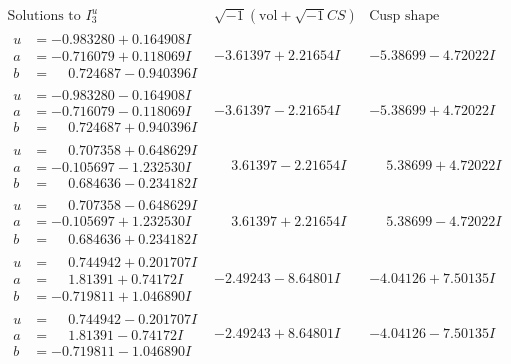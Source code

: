 \documentclass[1p]{elsarticle_modified}
\theoremstyle{definition}
\newcommand{\I}{\sqrt{-1}}
\begin{document}
$$\begin{array}{c|c|c}  
\text{Solutions to }I^u_{3}& \I (\text{vol} + \sqrt{-1}CS) & \text{Cusp shape}\\
 \hline 
\begin{aligned}
u &= -0.983280 + 0.164908 I \\
a &= -0.716079 + 0.118069 I \\
b &= \phantom{-}0.724687 - 0.940396 I\end{aligned}
 & -3.61397 + 2.21654 I & -5.38699 - 4.72022 I \\ \hline\begin{aligned}
u &= -0.983280 - 0.164908 I \\
a &= -0.716079 - 0.118069 I \\
b &= \phantom{-}0.724687 + 0.940396 I\end{aligned}
 & -3.61397 - 2.21654 I & -5.38699 + 4.72022 I \\ \hline\begin{aligned}
u &= \phantom{-}0.707358 + 0.648629 I \\
a &= -0.105697 - 1.232530 I \\
b &= \phantom{-}0.684636 - 0.234182 I\end{aligned}
 & \phantom{-}3.61397 - 2.21654 I & \phantom{-}5.38699 + 4.72022 I \\ \hline\begin{aligned}
u &= \phantom{-}0.707358 - 0.648629 I \\
a &= -0.105697 + 1.232530 I \\
b &= \phantom{-}0.684636 + 0.234182 I\end{aligned}
 & \phantom{-}3.61397 + 2.21654 I & \phantom{-}5.38699 - 4.72022 I \\ \hline\begin{aligned}
u &= \phantom{-}0.744942 + 0.201707 I \\
a &= \phantom{-}1.81391 + 0.74172 I \\
b &= -0.719811 + 1.046890 I\end{aligned}
 & -2.49243 - 8.64801 I & -4.04126 + 7.50135 I \\ \hline\begin{aligned}
u &= \phantom{-}0.744942 - 0.201707 I \\
a &= \phantom{-}1.81391 - 0.74172 I \\
b &= -0.719811 - 1.046890 I\end{aligned}
 & -2.49243 + 8.64801 I & -4.04126 - 7.50135 I \\ \hline\begin{aligned}

\end{aligned}
\end{array}$$
\end{document}
